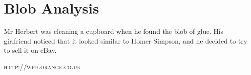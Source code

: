 \chapter{Blob Analysis} 
\label{chap:BlobAnalysis}

\epigraph{Mr Herbert was cleaning a cupboard when he found the blob of glue. His girlfriend noticed that it looked similar to Homer Simpson, and he decided to try to sell it on eBay.}
{\textsc{http://web.orange.co.uk}}

\pagebreak





%


